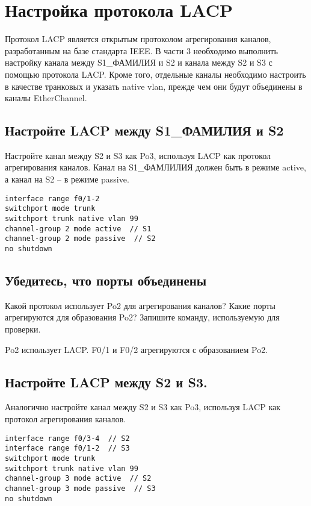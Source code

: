 \section{Настройка протокола LACP}
Протокол LACP является открытым протоколом агрегирования каналов, разработанным на базе
стандарта IEEE. В части 3 необходимо выполнить настройку канала между S1\_ФАМИЛИЯ и S2 и
канала между S2 и S3 с помощью протокола LACP. Кроме того, отдельные каналы необходимо
настроить в качестве транковых и указать native vlan, прежде чем они будут объединены в каналы
EtherChannel.



\subsection{Настройте LACP между S1\_ФАМИЛИЯ и S2}
Настройте канал между S2 и S3 как Po3, используя LACP как протокол агрегирования каналов. Канал
на S1\_ФАМЛИЛИЯ должен быть в режиме active, а канал на S2 – в режиме passive.

\begin{verbatim}
interface range f0/1-2
switchport mode trunk
switchport trunk native vlan 99
channel-group 2 mode active  // S1
channel-group 2 mode passive  // S2
no shutdown
\end{verbatim}

\subsection{Убедитесь, что порты объединены}

Какой протокол использует Po2 для агрегирования каналов?
Какие порты агрегируются для образования Po2?
Запишите команду, используемую для проверки.

Po2 использует LACP. F0/1 и F0/2 агрегируются с образованием Po2.



\subsection{Настройте LACP между S2 и S3.}
Аналогично настройте канал между S2 и S3 как Po3,
используя LACP как протокол агрегирования каналов.

\begin{verbatim}
interface range f0/3-4  // S2
interface range f0/1-2  // S3
switchport mode trunk
switchport trunk native vlan 99
channel-group 3 mode active  // S2
channel-group 3 mode passive  // S3
no shutdown
\end{verbatim}

